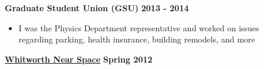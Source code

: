 \documentclass[margin]{res}
\begin{document}
\begin{resume}
{\bf Graduate Student Union (GSU)} \hfill {\bf 2013 - 2014}
    \begin{itemize}\itemsep -2pt
    \item[] I was the Physics Department representative and worked on issues \\regarding parking, health insurance, building remodels, and more
    \end{itemize} \vspace{-12pt}
{\bf\href{http://www.whitworthnearspace.org/wiki/Main_Page}{Whitworth Near Space}} \hfill  \textbf{Spring 2012} 
    \begin{itemize}\itemsep -2pt

\end{itemize}
\end{resume}
\end{document}
